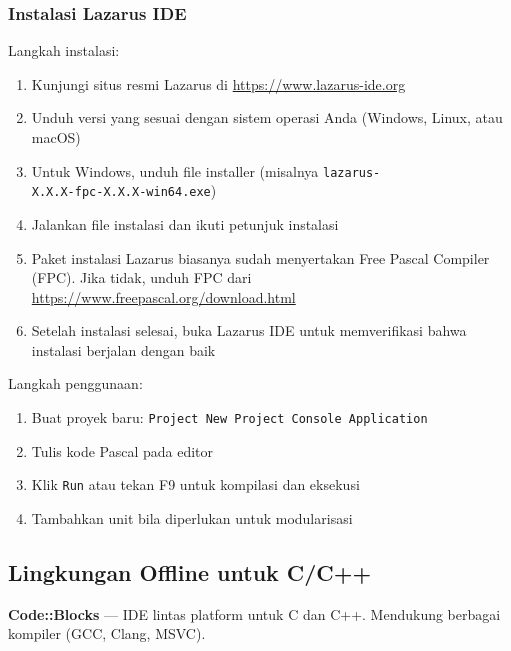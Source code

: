 \documentclass[../main.tex]{subfiles}
\begin{document}
\subsubsection{Instalasi Lazarus IDE}
Langkah instalasi:
\begin{enumerate}
  \item Kunjungi situs resmi Lazarus di \url{https://www.lazarus-ide.org}
  \item Unduh versi yang sesuai dengan sistem operasi Anda (Windows, Linux, atau macOS)
  \item Untuk Windows, unduh file installer (misalnya \texttt{lazarus-}\\\texttt{X.X.X-fpc-X.X.X-win64.exe})
  \item Jalankan file instalasi dan ikuti petunjuk instalasi
  \item Paket instalasi Lazarus biasanya sudah menyertakan Free Pascal Compiler (FPC). Jika tidak, unduh FPC dari \url{https://www.freepascal.org/download.html}
  \item Setelah instalasi selesai, buka Lazarus IDE untuk memverifikasi bahwa instalasi berjalan dengan baik
\end{enumerate}

Langkah penggunaan:
\begin{enumerate}
  \item Buat proyek baru: \texttt{Project \textrightarrow{} New Project \textrightarrow{} Console Application}
  \item Tulis kode Pascal pada editor
  \item Klik \texttt{Run} atau tekan F9 untuk kompilasi dan eksekusi
  \item Tambahkan unit bila diperlukan untuk modularisasi
\end{enumerate}

\subsection{Lingkungan Offline untuk C/C++}
\textbf{Code::Blocks} \parencite{codeblocks} — IDE lintas platform untuk C dan C++. Mendukung berbagai kompiler (GCC, Clang, MSVC).
\end{document}
